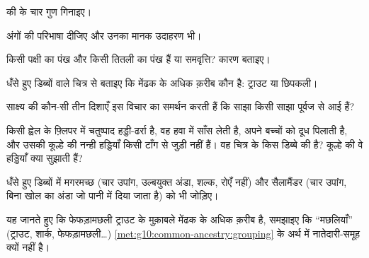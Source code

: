 \begin{exercise}[$\star$]\label{exo:g10:common-ancestry:1}
 की  के चार गुण गिनाइए।
\end{exercise}

\begin{exercise}[$\star$]\label{exo:g10:common-ancestry:2}
 अंगों की परिभाषा दीजिए और उनका मानक उदाहरण भी।
\end{exercise}

\begin{exercise}[$\star$]\label{exo:g10:common-ancestry:3}
किसी पक्षी का पंख और किसी तितली का पंख  हैं या समवृत्ति? कारण
बताइए।
\end{exercise}

\begin{exercise}[$\star$]\label{exo:g10:common-ancestry:4}
धँसे हुए डिब्बों वाले चित्र से बताइए कि मेंढक के अधिक क़रीब कौन है:
ट्राउट या छिपकली।
\end{exercise}

\begin{exercise}[$\star$]\label{exo:g10:common-ancestry:5}
साक्ष्य की कौन-सी तीन दिशाएँ इस विचार का समर्थन करती हैं कि साझा
 किसी साझा पूर्वज से आई हैं?
\end{exercise}

\begin{exercise}[$\star\star$]\label{exo:g10:common-ancestry:6}
किसी ह्वेल के फ़्लिपर में चतुष्पाद हड्डी-ढर्रा है, वह हवा में साँस लेती
है, अपने बच्चों को दूध पिलाती है, और उसकी कूल्हे की नन्ही हड्डियाँ किसी
टाँग से जुड़ी नहीं हैं। वह चित्र के किस डिब्बे की है? कूल्हे की वे
हड्डियाँ क्या सुझाती हैं?
\end{exercise}

\begin{exercise}[$\star\star$]\label{exo:g10:common-ancestry:7}
धँसे हुए डिब्बों में मगरमच्छ (चार उपांग, उल्बयुक्त अंडा, शल्क, रोएँ
नहीं) और सैलामैंडर (चार उपांग, बिना खोल का अंडा जो पानी में दिया जाता
है) को भी जोड़िए।
\end{exercise}

\begin{exercise}[$\star\star$]\label{exo:g10:common-ancestry:8}
यह जानते हुए कि फेफड़ामछली ट्राउट के मुक़ाबले मेंढक के अधिक क़रीब है,
समझाइए कि ``मछलियाँ'' (ट्राउट, शार्क, फेफड़ामछली\dots)
\cref{met:g10:common-ancestry:grouping} के अर्थ में नातेदारी-समूह क्यों
नहीं है।
\end{exercise}

